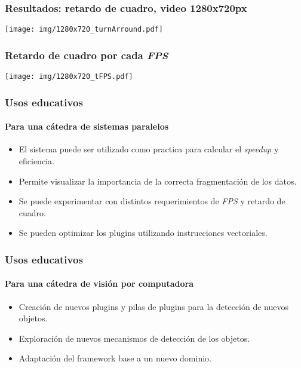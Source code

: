 \documentclass[11pt,a4paper,spanish]{beamer}
\begin{document}
\begin{frame}

\frametitle{Resultados: retardo de cuadro, video 1280x720px}

\texttt{[image: img/1280x720\_turnArround.pdf]}

\end{frame}

\begin{frame}

\frametitle{Retardo de cuadro por cada \emph{FPS}}

\texttt{[image: img/1280x720\_tFPS.pdf]}

\end{frame}

\begin{frame}

\frametitle{Usos educativos}

\framesubtitle{Para una cátedra de sistemas paralelos}

\begin{itemize}

	\item El sistema puede ser utilizado como practica para calcular el
		\emph{speedup} y eficiencia.
	
	\item Permite visualizar la importancia de la correcta fragmentación de
		los datos.

	\item Se puede experimentar con distintos requerimientos de \emph{FPS} y
		retardo de cuadro.

	\item Se pueden optimizar los plugins utilizando instrucciones
		vectoriales.

\end{itemize}

\end{frame}

\begin{frame}

\frametitle{Usos educativos}

\framesubtitle{Para una cátedra de visión por computadora}

\begin{itemize}

	\item Creación de nuevos plugins y pilas de plugins para la detección de
		nuevos objetos.

	\item Exploración de nuevos mecanismos de detección de los objetos.

	\item Adaptación del framework base a un nuevo dominio.

\end{itemize}

\end{frame}
\end{document}
